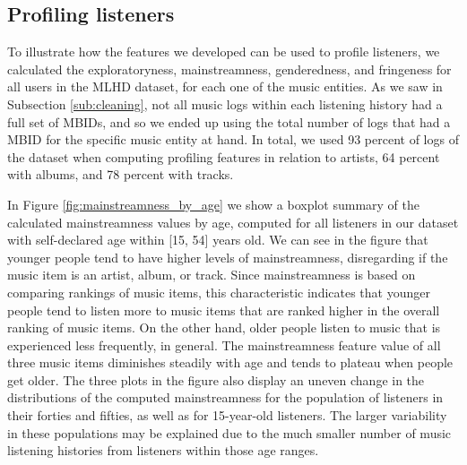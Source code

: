 \subsection{Profiling listeners}\label{sec:profiling}
\graphicspath{{./figs/ch6/}}
To illustrate how the features we developed can be used to profile listeners, we calculated the exploratoryness, mainstreamness, genderedness, and fringeness for all users in the MLHD dataset,  for each one of the music entities. 
As we saw in Subsection \ref{sub:cleaning}, not all music logs within each listening history had a full set of MBIDs, and so we ended up using the total number of logs that had a MBID for the specific music entity at hand. 
In total, we used 93 percent of logs of the dataset when computing profiling features in relation to artists, 64 percent with albums, and 78 percent with tracks.


In Figure \ref{fig:mainstreamness_by_age} we show a boxplot summary of the calculated mainstreamness values by age, computed for all listeners in our dataset with self-declared age within [15, 54] years old.
We can see in the figure that younger people tend to have higher levels of mainstreamness, disregarding if the music item is an artist, album, or track. 
Since mainstreamness is based on comparing rankings of music items, this characteristic indicates that younger people tend to listen more to music items that are ranked higher in the overall ranking of music items. On the other hand, older people listen to music that is experienced less frequently, in general.
The mainstreamness feature value of all three music items diminishes steadily with age and tends to plateau when people get older.
The three plots in the figure also display an uneven change in the distributions of the computed mainstreamness for the population of listeners in their forties and fifties, as well as for 15-year-old listeners. 
The larger variability in these populations may be explained due to the much smaller number of music listening histories from listeners within those age ranges.

